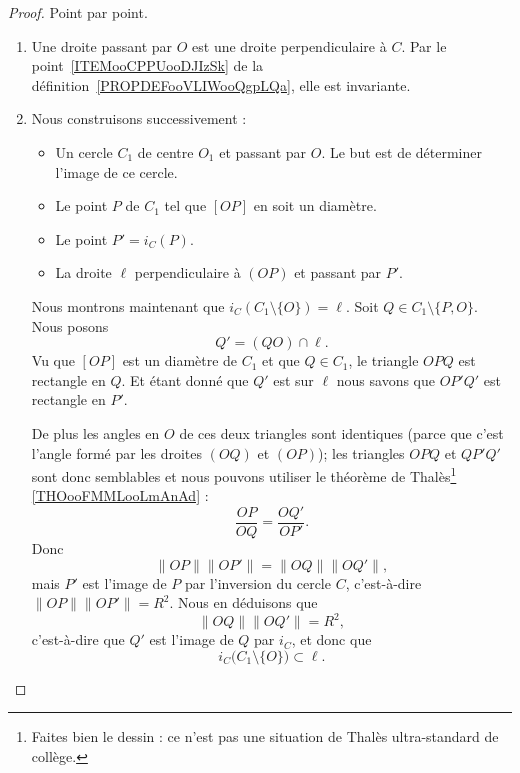 \begin{proof}
	Point par point.
	\begin{enumerate}
		\item
		      Une droite passant par \( O\) est une droite perpendiculaire à \( C\). Par le point~\ref{ITEMooCPPUooDJIzSk} de la définition~\ref{PROPDEFooVLIWooQgpLQa}, elle est invariante.
		\item
		      Nous construisons successivement :
		      \begin{itemize}
			      \item
			            Un cercle \( C_1\) de centre \( O_1\) et passant par \( O\). Le but est de déterminer l'image de ce cercle.
			      \item
			            Le point \( P\) de \( C_1\) tel que \( [OP]\) en soit un diamètre.
			      \item
			            Le point \( P'=i_C(P)\).
			      \item
			            La droite \( \ell\) perpendiculaire à \( (OP)\) et passant par \( P'\).
		      \end{itemize}
		      Nous montrons maintenant que \( i_C(C_1\setminus\{ O \})=\ell\). Soit \( Q\in C_1\setminus\{ P,O \}\). Nous posons
		      \begin{equation}
			      Q'=(QO)\cap \ell.
		      \end{equation}
		      Vu que \( [OP]\) est un diamètre de \( C_1\) et que \( Q\in C_1\), le triangle \( OPQ\) est rectangle en \( Q\). Et étant donné que \( Q'\) est sur \( \ell\) nous savons que \( OP'Q'\) est rectangle en \( P'\).

		      De plus les angles en \( O\) de ces deux triangles sont identiques (parce que c'est l'angle formé par les droites \( (OQ) \) et \( (OP)\)); les triangles \( OPQ\) et \( QP'Q'\) sont donc semblables et nous pouvons utiliser le théorème de Thalès\footnote{Faites bien le dessin : ce n'est pas une situation de Thalès ultra-standard de collège.} \ref{THOooFMMLooLmAnAd} :
		      \begin{equation}
			      \frac{ OP }{ OQ }=\frac{ OQ' }{ OP' }.
		      \end{equation}
		      Donc
		      \begin{equation}
			      \| OP \|\| OP' \|=\| OQ \|\| OQ' \|,
		      \end{equation}
		      mais \( P'\) est l'image de \( P\) par l'inversion du cercle \( C\), c'est-à-dire \( \| OP \|\| OP' \|=R^2\). Nous en déduisons que
		      \begin{equation}
			      \| OQ \| \| OQ' \|=R^2,
		      \end{equation}
		      c'est-à-dire que \( Q'\) est l'image de \( Q\) par \( i_C\), et donc que
		      \begin{equation}        \label{EQooPJBGooGeIVQQ}
			      i_C\big( C_1\setminus\{ O \} \big)\subset \ell.
		      \end{equation}


\end{enumerate}
\end{proof}
